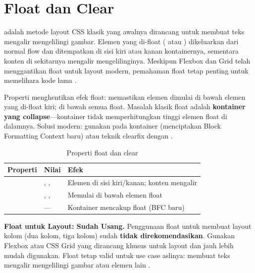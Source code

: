 \section{Float dan Clear}

 adalah metode layout CSS klasik yang awalnya dirancang untuk membuat teks mengalir mengelilingi gambar. Elemen yang di-float ( atau ) dikeluarkan dari normal flow dan ditempatkan di sisi kiri atau kanan kontainernya, sementara konten di sekitarnya mengalir mengelilinginya. Meskipun Flexbox dan Grid telah menggantikan float untuk layout modern, pemahaman float tetap penting untuk memelihara kode lama \cite{mdnCss}.

Properti  menghentikan efek float:  memastikan elemen dimulai di bawah elemen yang di-float kiri;  di bawah semua float. Masalah klasik float adalah \textbf{kontainer yang collapse}---kontainer tidak memperhitungkan tinggi elemen float di dalamnya. Solusi modern: gunakan  pada kontainer (menciptakan Block Formatting Context baru) atau teknik clearfix dengan  \cite{webdevCss}.

\begin{table}[htbp]
\centering
\begin{tabular}{|P{3cm}|P{4cm}|P{5cm}|}
\hline
\textbf{Properti} & \textbf{Nilai} & \textbf{Efek} \\
\hline
{} & , ,  & Elemen di sisi kiri/kanan; konten mengalir \\
\hline
{} & , ,  & Memulai di bawah elemen float \\
\hline
{} & --- & Kontainer mencakup float (BFC baru) \\
\hline
\end{tabular}
\caption{Properti float dan clear}
\end{table}

\begin{catatan}
\textbf{Float untuk Layout: Sudah Usang.} Penggunaan float untuk membuat layout kolom (dua kolom, tiga kolom) sudah \textbf{tidak direkomendasikan}. Gunakan Flexbox atau CSS Grid yang dirancang khusus untuk layout dan jauh lebih mudah digunakan. Float tetap valid untuk use case aslinya: membuat teks mengalir mengelilingi gambar atau elemen lain \cite{cssTricks}.
\end{catatan}

